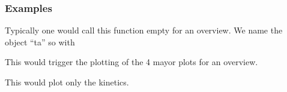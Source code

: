 \documentclass[letterpaper,10pt,english]{sphinxmanual}
\begin{document}
\begin{fulllineitems}
\begin{fulllineitems}
\begin{quote}
\begin{description}
\end{description}\end{quote}
\subsubsection*{Examples}

Typically one would call this function empty for an overview. We name the object “ta” so with

\begin{sphinxVerbatim}[commandchars=\\\{\}]
\end{sphinxVerbatim}

This would trigger the plotting of the 4 mayor plots for an overview.

\begin{sphinxVerbatim}[commandchars=\\\{\}]
\end{sphinxVerbatim}

This would plot only the kinetics.

\begin{sphinxVerbatim}[commandchars=\\\{\}]
  
\end{sphinxVerbatim}

\end{fulllineitems}



\end{fulllineitems}
\end{document}
